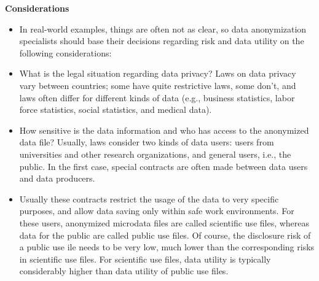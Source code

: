 \documentclass{beamer}
\begin{document}
\begin{frame}
\textbf{Considerations}
	\begin{itemize}
\item In real-world examples, things are often not as clear, so data anonymization specialists should base their decisions regarding risk and data utility on the following
considerations:
%
%
%

\item What is the legal situation regarding data privacy? Laws on data privacy vary
between countries; some have quite restrictive laws, some don’t, and laws often
differ for different kinds of data (e.g., business statistics, labor force statistics,
social statistics, and medical data).

\end{itemize}
\end{frame}
\begin{frame}
	\begin{itemize}

\item How sensitive is the data information and who has access to the anonymized
data file? Usually, laws consider two kinds of data users: users from universities
and other research organizations, and general users, i.e., the public. In the ﬁrst
case, special contracts are often made between data users and data producers.

\item Usually these contracts restrict the usage of the data to very speciﬁc purposes, and
allow data saving only within safe work environments. For these users, anonymized
microdata ﬁles are called scientiﬁc use ﬁles, whereas data for the public are called
public use ﬁles. Of course, the disclosure risk of a public use ile needs to be very
low, much lower than the corresponding risks in scientiﬁc use ﬁles. For scientiﬁc
use ﬁles, data utility is typically considerably higher than data utility of public use
ﬁles.

\end{itemize}
\end{frame}
\end{document}

